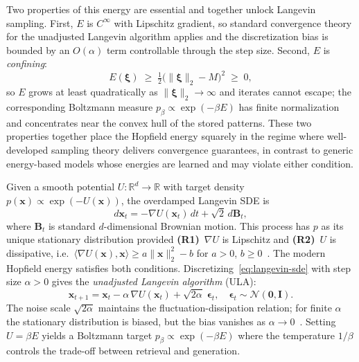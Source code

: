 Two properties of this energy are essential and together unlock Langevin sampling. First, $E$ is $C^{\infty}$ with Lipschitz gradient, so standard convergence theory for the unadjusted Langevin algorithm applies and the discretization bias is bounded by an $O(\alpha)$ term controllable through the step size. Second, $E$ is \emph{confining}:
\begin{equation}\label{eq:energy-lower-bound}
    E(\boldsymbol{\xi}) \;\ge\; \tfrac{1}{2}\bigl(\|\boldsymbol{\xi}\|_2 - M\bigr)^2 \;\ge\; 0,
\end{equation}
so $E$ grows at least quadratically as $\|\boldsymbol{\xi}\|_{2}\to\infty$ and iterates cannot escape; the corresponding Boltzmann measure $p_\beta\propto\exp(-\beta E)$ has finite normalization and concentrates near the convex hull of the stored patterns. These two properties together place the Hopfield energy squarely in the regime where well-developed sampling theory delivers convergence guarantees, in contrast to generic energy-based models whose energies are learned and may violate either condition.

Given a smooth potential $U:\mathbb{R}^d\to\mathbb{R}$ with target density $p(\mathbf{x})\propto\exp(-U(\mathbf{x}))$, the overdamped Langevin SDE is
\begin{equation}\label{eq:langevin-sde}
    d\mathbf{x}_t = -\nabla U(\mathbf{x}_t)\,dt + \sqrt{2}\,d\mathbf{B}_t,
\end{equation}
where $\mathbf{B}_t$ is standard $d$-dimensional Brownian motion. This process has $p$ as its unique stationary distribution provided \textbf{(R1)}~$\nabla U$ is Lipschitz and \textbf{(R2)}~$U$ is dissipative, i.e.\ $\langle \nabla U(\mathbf{x}),\mathbf{x}\rangle \ge a\|\mathbf{x}\|_2^2 - b$ for $a>0$, $b\ge 0$~\cite{robertsTweedieExponentialConvergence1996}. The modern Hopfield energy satisfies both conditions. Discretizing~\eqref{eq:langevin-sde} with step size $\alpha>0$ gives the \emph{unadjusted Langevin algorithm} (ULA):
\begin{equation}\label{eq:ula}
    \mathbf{x}_{t+1}
    = \mathbf{x}_t - \alpha\,\nabla U(\mathbf{x}_t) + \sqrt{2\alpha}\;\boldsymbol{\epsilon}_t,
    \quad \boldsymbol{\epsilon}_t\sim\mathcal{N}(\mathbf{0},\mathbf{I}).
\end{equation}
The noise scale $\sqrt{2\alpha}$ maintains the fluctuation-dissipation relation; for finite $\alpha$ the stationary distribution is biased, but the bias vanishes as $\alpha\to 0$~\cite{durmusNonasymptoticAnalysisUnadjusted2017}. Setting $U=\beta E$ yields a Boltzmann target $p_\beta\propto\exp(-\beta E)$ where the temperature $1/\beta$ controls the trade-off between retrieval and generation.
